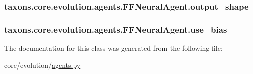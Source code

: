 \subsubsection[{\texorpdfstring{output\+\_\+shape}{output_shape}}]{\setlength{\rightskip}{0pt plus 5cm}taxons.\+core.\+evolution.\+agents.\+F\+F\+Neural\+Agent.\+output\+\_\+shape}\hypertarget{classtaxons_1_1core_1_1evolution_1_1agents_1_1_f_f_neural_agent_acb240f0be94cdcf367a52ad574ef73ba}{}\label{classtaxons_1_1core_1_1evolution_1_1agents_1_1_f_f_neural_agent_acb240f0be94cdcf367a52ad574ef73ba}
\subsubsection[{\texorpdfstring{use\+\_\+bias}{use_bias}}]{\setlength{\rightskip}{0pt plus 5cm}taxons.\+core.\+evolution.\+agents.\+F\+F\+Neural\+Agent.\+use\+\_\+bias}\hypertarget{classtaxons_1_1core_1_1evolution_1_1agents_1_1_f_f_neural_agent_ac411d0381853dcd7c5cab6e96c5118f0}{}\label{classtaxons_1_1core_1_1evolution_1_1agents_1_1_f_f_neural_agent_ac411d0381853dcd7c5cab6e96c5118f0}


The documentation for this class was generated from the following file\+:\begin{DoxyCompactItemize}
\item 
core/evolution/\hyperlink{agents_8py}{agents.\+py}\end{DoxyCompactItemize}
